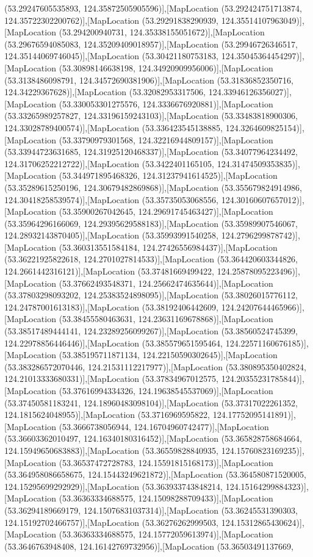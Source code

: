(53.29247605535893, 124.35872505905596)],[MapLocation (53.292424751713874, 124.35722302200762)],[MapLocation (53.29291838290939, 124.35514107963049)],[MapLocation (53.294200940731, 124.35338155051672)],[MapLocation (53.29676594085083, 124.35209409018957)],[MapLocation (53.29946726346517, 124.35144069746045)],[MapLocation (53.30421180753183, 124.35045364454297)],[MapLocation (53.30898146638198, 124.34920909956006)],[MapLocation (53.3138486098791, 124.34572690381906)],[MapLocation (53.31836852350716, 124.34229367628)],[MapLocation (53.32082953317506, 124.33946126356027)],[MapLocation (53.330053301275576, 124.3336676920881)],[MapLocation (53.33265989257827, 124.33196159243103)],[MapLocation (53.33483818900306, 124.33028789400574)],[MapLocation (53.336423545138885, 124.3264609825154)],[MapLocation (53.33790979301568, 124.32216944809157)],[MapLocation (53.33944723631685, 124.31925120468337)],[MapLocation (53.34077964234492, 124.31706252212722)],[MapLocation (53.3422401165105, 124.31474509353835)],[MapLocation (53.344971895468326, 124.31237941614525)],[MapLocation (53.35289615250196, 124.30679482869868)],[MapLocation (53.355679824914986, 124.30418258539574)],[MapLocation (53.35735053068556, 124.30160607657012)],[MapLocation (53.35900267042645, 124.29691745463427)],[MapLocation (53.35964296166069, 124.29395629588183)],[MapLocation (53.35989907546067, 124.28932143870405)],[MapLocation (53.35993991540258, 124.2796299878742)],[MapLocation (53.360313551584184, 124.27426556984437)],[MapLocation (53.36221925822618, 124.2701027814533)],[MapLocation (53.364420603344826, 124.2661442316121)],[MapLocation (53.37481669499422, 124.25878095223496)],[MapLocation (53.37662493548371, 124.25662474635644)],[MapLocation (53.37803298093202, 124.25383524898095)],[MapLocation (53.38026015776112, 124.24787001613183)],[MapLocation (53.38192406442609, 124.24207644465966)],[MapLocation (53.38455580463631, 124.23631169678868)],[MapLocation (53.38517489444141, 124.23289256099267)],[MapLocation (53.38560524745399, 124.22978856446446)],[MapLocation (53.385579651595464, 124.22571160676185)],[MapLocation (53.385195711871134, 124.22150590302645)],[MapLocation (53.383286572070446, 124.21531112217977)],[MapLocation (53.380895350402824, 124.21013333680331)],[MapLocation (53.37834967012575, 124.20355231785844)],[MapLocation (53.37616994334326, 124.19638545537069)],[MapLocation (53.37450581183241, 124.18960483098104)],[MapLocation (53.37317022261352, 124.1815624048955)],[MapLocation (53.3716969595822, 124.17752095141891)],[MapLocation (53.3666738056944, 124.16704960742477)],[MapLocation (53.36603362010497, 124.16340180316452)],[MapLocation (53.365828758684664, 124.15949650683883)],[MapLocation (53.36559828840935, 124.15760823169235)],[MapLocation (53.36537472728783, 124.15591815168173)],[MapLocation (53.364958086658675, 124.15443249621872)],[MapLocation (53.364580871520005, 124.15295699292929)],[MapLocation (53.363933743848214, 124.15164299884323)],[MapLocation (53.36363334688575, 124.15098288709433)],[MapLocation (53.36294189669179, 124.15076831037314)],[MapLocation (53.36245531390303, 124.15192702466757)],[MapLocation (53.36276262999503, 124.15312865430624)],[MapLocation (53.36363334688575, 124.15772059613974)],[MapLocation (53.3646763948408, 124.16142769732956)],[MapLocation (53.36503491137669, 